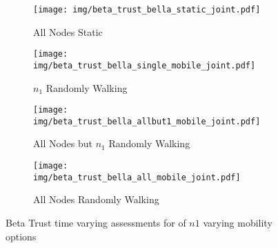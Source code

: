 \begin{figure}
\begin{subfigure}{\textwidth}
  \centering
  \texttt{[image: img/beta\_trust\_bella\_static\_joint.pdf]}
  \caption{All Nodes Static}
  \label{fig:beta_trust_static}
\end{subfigure}
\begin{subfigure}{\textwidth}
  \centering
  \texttt{[image: img/beta\_trust\_bella\_single\_mobile\_joint.pdf]}
  \caption{$n_1$ Randomly Walking}
  \label{fig:beta_trust_single}
\end{subfigure}
\begin{subfigure}{\textwidth}
\centering
  \texttt{[image: img/beta\_trust\_bella\_allbut1\_mobile\_joint.pdf]}
  \caption{All Nodes but $n_1$ Randomly Walking}
  \label{fig:beta_trust_allbut1}
\end{subfigure}
\begin{subfigure}{\textwidth}
\centering
  \texttt{[image: img/beta\_trust\_bella\_all\_mobile\_joint.pdf]}
  \caption{All Nodes Randomly Walking}
  \label{fig:beta_trust_all_mobile}
\end{subfigure}
\caption{Beta Trust time varying assessments for of $n1$ varying mobility options}
\label{fig:trust_mobility}
\end{figure}




